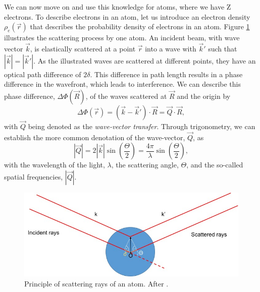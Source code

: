 We can now move on and use this knowledge for atoms, where we have Z electrons. To describe electrons in an atom, let us introduce an electron density $\rho_{e}\left(\vec{r}\right)$ that describes the probability density of electrons in an atom. Figure \ref{fig:X-ray-scattering} illustrates the scattering process by one atom. An incident beam, with wave vector $\vec{k}$, is elastically scattered at a point $\vec{r}$ into a wave with $\vec{k}'$ such that $\left|\vec{k}\right|=\left|\vec{k}'\right|$. As the illustrated waves are scattered at different points, they have an optical path difference of $2 \delta$. This difference in path length results in a phase difference in the wavefront, which leads to interference. We can describe this phase difference, $\Delta \Phi\left(\vec{R}\right)$, of the waves scattered at $\vec{R}$ and the origin by
\begin{equation}
\Delta \Phi\left(\vec{r}\right) = \left(\vec{k}-\vec{k}'\right)\cdot \vec{R} = \vec{Q} \cdot \vec{R},
\label{eq:phase-difference}
\end{equation}
with $\vec{Q}$ being denoted as the \textit{wave-vector transfer}. Through trigonometry, we can establish the more common denotation of the wave-vector, $\vec{Q}$, as
\begin{equation}
\left|\vec{Q}\right|=2 \left|\vec{k}\right| \sin\left(\frac{\Theta}{2}\right)=\frac{4 \pi}{\lambda}\sin\left(\frac{\Theta}{2}\right),
\label{eq:Q-scattering-angle}
\end{equation}
with the wavelength of the light, $\lambda$, the scattering angle, $\Theta$, and the so-called spatial frequencies, $\left|\vec{Q}\right|$.\\[1\baselineskip]
\begin{figure}
	\centering
		\includegraphics[width=1.00\textwidth]{images/X-ray-scattering.jpg}
	\caption[Principle of scattering rays of an atom.]{Principle of scattering rays of an atom. After \cite{Als-Nielson-2011-JWS,Guinier-1955-JWS}.}
	\label{fig:X-ray-scattering}
\end{figure}
